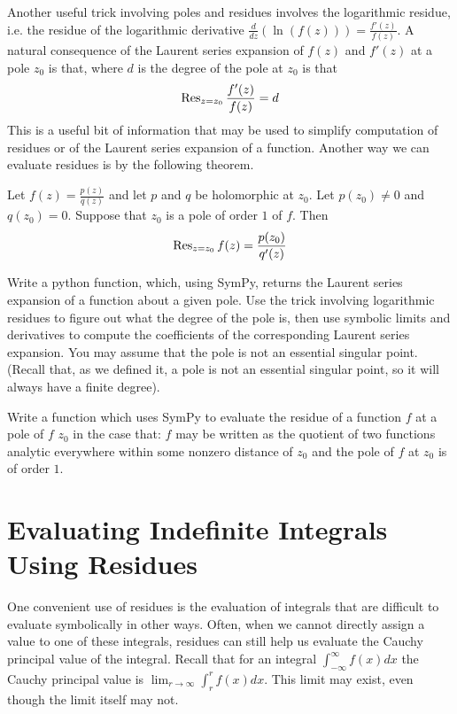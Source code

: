 Another useful trick involving poles and residues involves the logarithmic residue, i.e. the residue of the logarithmic derivative $\frac{d}{dz}(\ln(f(z))) = \frac{f'(z)}{f(z)}$. A natural consequence of the Laurent series expansion of $f(z)$ and $f'(z)$ at a pole $z_0$ is that, where $d$ is the degree of the pole at $z_0$ is that
\begin{equation*}
\operatorname{Res}_{z=z_0} \frac{f'(z)}{f(z)} = d
\end{equation*}
This is a useful bit of information that may be used to simplify computation of residues or of the Laurent series expansion of a function. 
Another way we can evaluate residues is by the following theorem.
\begin{theorem}
Let $f(z)=\frac{p(z)}{q(z)}$ and let $p$ and $q$ be holomorphic at $z_0$. Let $p(z_0) \neq 0$ and $q(z_0)=0$. Suppose that $z_0$ is a pole of order $1$ of $f$. Then 
\begin{equation*}
\operatorname{Res}_{z=z_0} f(z) = \frac{p(z_0)}{q'(z)}
\end{equation*}
\end{theorem}

\begin{problem}
Write a python function, which, using SymPy, returns the Laurent series expansion of a function about a given pole. Use the trick involving logarithmic residues to figure out what the degree of the pole is, then use symbolic limits and derivatives to compute the coefficients of the corresponding Laurent series expansion. You may assume that the pole is not an essential singular point. (Recall that, as we defined it, a pole is not an essential singular point, so it will always have a finite degree).
\end{problem}

\begin{problem}
Write a function which uses SymPy to evaluate the residue of a function $f$ at a pole of $f$ $z_0$ in the case that: $f$ may be written as the quotient of two functions analytic everywhere within some nonzero distance of $z_0$ and the pole of $f$ at $z_0$ is of order $1$.
\end{problem}

\section*{Evaluating Indefinite Integrals Using Residues}

One convenient use of residues is the evaluation of integrals that are difficult to evaluate symbolically in other ways. 
Often, when we cannot directly assign a value to one of these integrals, residues can still help us evaluate the Cauchy principal value of the integral. Recall that for an integral $\int_{-\infty}^{\infty} f(x)dx$ the Cauchy principal value is $\lim_{r\to \infty} \int_{r}^{r} f(x) dx$. This limit may exist, even though the limit itself may not.

